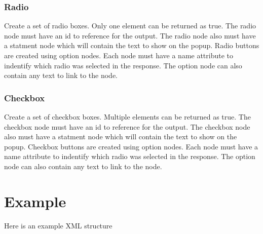 \documentclass{article}
\begin{document}
\subsubsection{Radio}

Create a set of radio boxes. Only one element can be returned as true. The radio node must have an id to reference for the output. The radio node also must have a statment node which will contain the text to show on the popup. Radio buttons are created using option nodes. Each node must have a name attribute to indentify which radio was selected in the response. The option node can also contain any text to link to the node.

\subsubsection{Checkbox}

Create a set of checkbox boxes. Multiple elements can be returned as true. The checkbox node must have an id to reference for the output. The checkbox node also must have a statment node which will contain the text to show on the popup. Checkbox buttons are created using option nodes. Each node must have a name attribute to indentify which radio was selected in the response. The option node can also contain any text to link to the node.

\section{Example}

Here is an example XML structure
\end{document}
